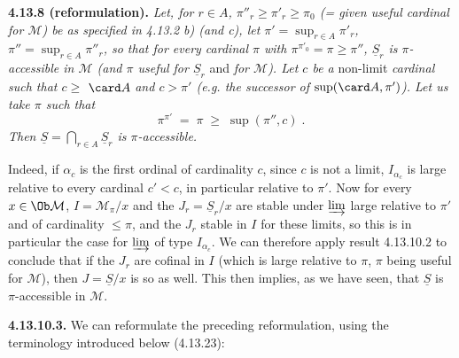 \textbf{4.13.8 (reformulation).} \textit{Let, for $r\in A$, $\pi''_r\geqslant\pi'_r\geqslant\pi_0$ (= given useful cardinal for $\mathcal{M}$) be as specified in 4.13.2 b) (and c), let $\pi'=\sup_{r\in A}\pi'_r$, $\pi''=\sup_{r\in A}\pi''_r$, so that for every cardinal $\pi$ with $\pi^{\pi'_0}=\pi\geqslant\pi''$, $\underline{S}_r$ is $\pi$-accessible in $\mathcal{M}$ (and $\pi$ useful for $\underline{S}_r$} and \textit{for $\mathcal{M}$). Let $c$ be a} non-limit \textit{cardinal such that $c\geqslant$} $\card A$ \textit{and $c>\pi'$ (e.g. the successor of} $\sup(\card A,\pi')$\textit{). Let us take $\pi$ such that}
\[ \pi^{\pi'} \; = \; \pi \; \geqslant \; \sup(\pi'',c) \; . \]
\textit{Then $\underline{S}=\bigcap_{r\in A}\underline{S}_r$ is $\pi$-accessible.}

Indeed, if $\alpha_c$ is the first ordinal of cardinality $c$, since $c$ is not a limit, $I_{\alpha_c}$ is large relative to every cardinal $c'<c$, in particular relative to $\pi'$. Now for every $x\in\Ob\mathcal{M}$, $I=\mathcal{M}_\pi/x$ and the $J_r=\underline{S}_r/x$ are stable under $\varinjlim$ large relative to $\pi'$ and of cardinality $\leqslant\pi$,
and the $J_r$ stable in $I$ for these limits, so this is in particular the case for $\varinjlim$ of type $I_{\alpha_c}$. We can therefore apply result 4.13.10.2 to conclude that if the $J_r$ are cofinal in $I$ (which is large relative to $\pi$, $\pi$ being useful for $\mathcal{M}$), then $J=\underline{S}/x$ is so as well. This then implies, as we have seen, that $\underline{S}$ is $\pi$-accessible in $\mathcal{M}$.

\textbf{4.13.10.3.} We can reformulate the preceding reformulation, using the terminology introduced below (4.13.23):

